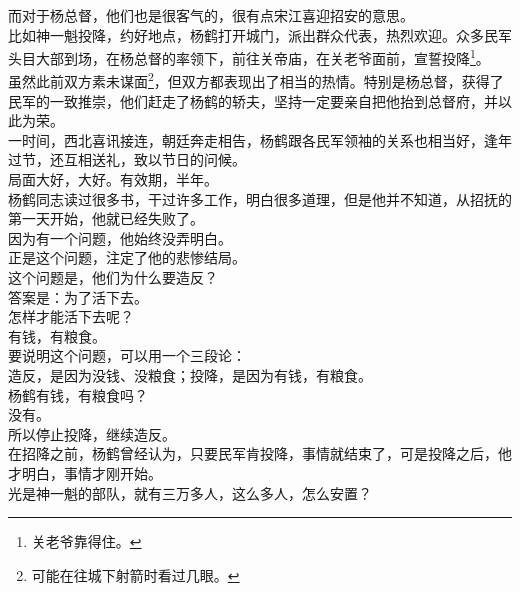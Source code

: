 \begin{multicols}{\theparacolNo}
而对于杨总督，他们也是很客气的，很有点宋江喜迎招安的意思。\\

比如神一魁投降，约好地点，杨鹤打开城门，派出群众代表，热烈欢迎。众多民军头目大部到场，在杨总督的率领下，前往关帝庙，在关老爷面前，宣誓投降\footnote{关老爷靠得住。}。\\

虽然此前双方素未谋面\footnote{可能在往城下射箭时看过几眼。}，但双方都表现出了相当的热情。特别是杨总督，获得了民军的一致推崇，他们赶走了杨鹤的轿夫，坚持一定要亲自把他抬到总督府，并以此为荣。\\

一时间，西北喜讯接连，朝廷奔走相告，杨鹤跟各民军领袖的关系也相当好，逢年过节，还互相送礼，致以节日的问候。\\

局面大好，大好。有效期，半年。\\

杨鹤同志读过很多书，干过许多工作，明白很多道理，但是他并不知道，从招抚的第一天开始，他就已经失败了。\\

因为有一个问题，他始终没弄明白。\\

正是这个问题，注定了他的悲惨结局。\\

这个问题是，他们为什么要造反？\\

答案是：为了活下去。\\

怎样才能活下去呢？\\

有钱，有粮食。\\

要说明这个问题，可以用一个三段论：\\

造反，是因为没钱、没粮食；投降，是因为有钱，有粮食。\\

杨鹤有钱，有粮食吗？\\

没有。\\

所以停止投降，继续造反。\\

在招降之前，杨鹤曾经认为，只要民军肯投降，事情就结束了，可是投降之后，他才明白，事情才刚开始。\\

光是神一魁的部队，就有三万多人，这么多人，怎么安置？\\


\end{multicols}
